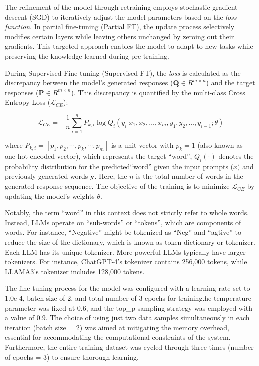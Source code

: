 The refinement of the model through retraining employs stochastic gradient descent (SGD) to iteratively adjust the model parameters based on the \textit{loss function}. In partial fine-tuning (Partial FT), the update process selectively modifies certain layers while leaving others unchanged by zeroing out their gradients. This targeted approach enables the model to adapt to new tasks while preserving the knowledge learned during pre-training.

During Supervised-Fine-tuning (Supervised-FT), the \textit{loss} is calculated as the discrepancy between the model's generated responses ($\bm{Q} \in R^{m\times n}$) and the target responses ($\bm{P} \in R^{m \times n}$). This discrepancy is quantified by the multi-class Cross Entropy Loss ($\mathcal{L}_{CE}$):

\begin{equation*}
  \mathcal{L}_{CE} = -\frac{1}{n}\sum_{i=1}^{n} P_{k,i}\log  Q_i(y_i|x_1, x_2, \dots,x_m, y_1, y_2, \dots, y_{i-1}; \theta)
\end{equation*}

where $P_{k,i} = [p_1, p_2, \cdots, p_k, \cdots,p_m]$ is a unit vector with $p_k = 1$ (also known as one-hot encoded vector), which represents the target ``word'', $Q_i(\cdot)$ denotes the probability distribution for the predicted``word'' given the input prompts $\bm(x)$ and previously generated words $\bm{y}$. Here, the $n$ is the total number of words in the generated response sequence. The objective of the training is to minimize $\mathcal{L}_{CE}$ by updating the model's weights $\theta$.  

Notably, the term ``word'' in this context does not strictly refer to whole words. Instead, LLMs operate on ``sub-words'' or ``tokens'', which are components of words. For instance, ``Negative'' might be tokenized as ``Neg'' and ``agtive'' to reduce the size of the dictionary, which is known as token dictionary or tokenizer. Each LLM has its unique tokenizer. More powerful LLMs typically have larger tokenizers. For instance, ChatGPT-4's tokenizer contains 256,000 tokens, while LLAMA3's tokenizer includes 128,000 tokens. 


The fine-tuning process for the model was configured with a learning rate set to 1.0e-4, batch size of 2, and total number of 3 epochs for training.he temperature parameter was fixed at 0.6, and the top\_p sampling strategy was employed with a value of 0.9. The choice of using just two data samples simultaneously in each iteration (batch size = 2) was aimed at mitigating the memory overhead, essential for accommodating the computational constraints of the system. Furthermore, the entire training dataset was cycled through three times (number of epochs = 3) to ensure thorough learning.

